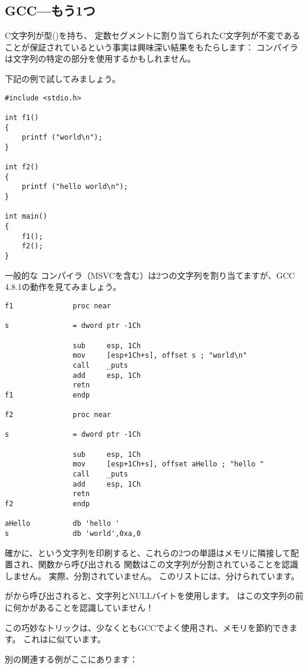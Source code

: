 \subsection{GCC---もう1つ}
\label{use_parts_of_C_strings}

C文字列が型()を持ち、
定数セグメントに割り当てられたC文字列が不変であることが保証されているという事実は興味深い結果をもたらします：
コンパイラは文字列の特定の部分を使用するかもしれません。

下記の例で試してみましょう。

\begin{lstlisting}[style=customc]
#include <stdio.h>

int f1()
{
	printf ("world\n");
}

int f2()
{
	printf ("hello world\n");
}

int main()
{
	f1();
	f2();
}
\end{lstlisting}

一般的な \CCpp{} コンパイラ（MSVCを含む）は2つの文字列を割り当てますが、GCC 4.8.1の動作を見てみましょう。

\begin{lstlisting}[caption=GCC 4.8.1 + IDA listing,style=customasmx86]
f1              proc near

s               = dword ptr -1Ch

                sub     esp, 1Ch
                mov     [esp+1Ch+s], offset s ; "world\n"
                call    _puts
                add     esp, 1Ch
                retn
f1              endp

f2              proc near

s               = dword ptr -1Ch

                sub     esp, 1Ch
                mov     [esp+1Ch+s], offset aHello ; "hello "
                call    _puts
                add     esp, 1Ch
                retn
f2              endp

aHello          db 'hello '
s               db 'world',0xa,0
\end{lstlisting}

確かに、という文字列を印刷すると、これらの2つの単語はメモリに隣接して配置され、関数から呼び出される \puts 関数はこの文字列が分割されていることを認識しません。 
実際、分割されていません。 このリストには、分けられています。

\puts がから呼び出されると、文字列とNULLバイトを使用します。 \puts はこの文字列の前に何かがあることを認識していません！

この巧妙なトリックは、少なくともGCCでよく使用され、メモリを節約できます。 これはに似ています。

別の関連する例がここにあります：
